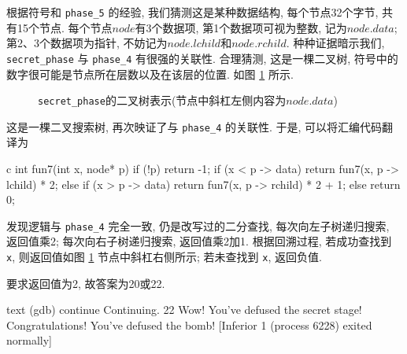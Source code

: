 根据符号和 \verb|phase_5| 的经验, 我们猜测这是某种数据结构, 每个节点32个字节, 共有15个节点. 每个节点$node$有3个数据项, 第1个数据项可视为整数, 记为$node.data$; 第2、3个数据项为指针, 不妨记为$node.lchild$和$node.rchild$. 种种证据暗示我们, \verb|secret_phase| 与 \verb|phase_4| 有很强的关联性. 合理猜测, 这是一棵二叉树, 符号中的数字很可能是节点所在层数以及在该层的位置. 如图 \ref{fig:tree} 所示.
\begin{figure}[H]
    \centering
    \small
    \caption{\texttt{secret_phase}的二叉树表示(节点中斜杠左侧内容为$node.data$)}\label{fig:tree}
\end{figure}
这是一棵二叉搜索树, 再次映证了与 \verb|phase_4| 的关联性. 于是, 可以将汇编代码翻译为
\begin{code}{c}
int fun7(int x, node* p) {
    if (!p) return -1;
    if (x < p -> data)
        return fun7(x, p -> lchild) * 2;
    else if (x > p -> data)
        return fun7(x, p -> rchild) * 2 + 1;
    else
        return 0;
}
\end{code}
发现逻辑与 \verb|phase_4| 完全一致, 仍是改写过的二分查找, 每次向左子树递归搜索, 返回值乘2; 每次向右子树递归搜索, 返回值乘2加1. 根据回溯过程, 若成功查找到 \verb|x|, 则返回值如图 \ref{fig:tree} 节点中斜杠右侧所示; 若未查找到 \verb|x|, 返回负值.

要求返回值为2, 故答案为20或22.
\begin{code}{text}
(gdb) continue
Continuing.
22
Wow! You've defused the secret stage!
Congratulations! You've defused the bomb!
[Inferior 1 (process 6228) exited normally]
\end{code}

